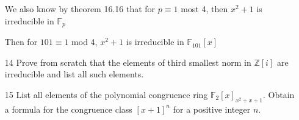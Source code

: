 \documentclass[12pt]{article}
\begin{document}
\begin{itemize}
		We also know by theorem 16.16 that for $p \equiv 1$ most 4, then $x^2 + 1$ is irreducible in $\mathbb{F}_p$

		Then for $101 \equiv 1$ mod 4, $x^2 + 1$ is irreducible in $\mathbb{F}_{101}[x]$

	\item[14] Prove from scratch that the elements of third smallest norm in $\mathbb{Z}[i]$ are irreducible and list all such elements.

	\item[15] List all elements of the polynomial congruence ring $\mathbb{F}_2[x]_{x^2 + x + 1}$. Obtain a formula for the congruence class $[x+1]^n$ for a positive integer $n$.
\end{itemize}
\end{document}
